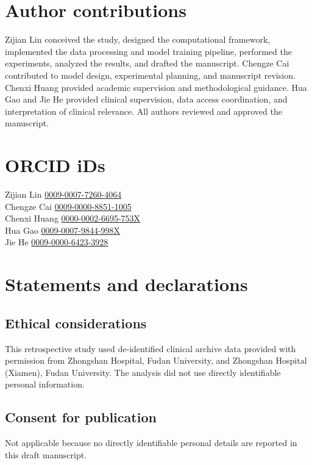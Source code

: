 \documentclass[Afour,sagev,times]{sagej}
\begin{document}
\section*{Author contributions}

Zijian Lin conceived the study, designed the computational framework, implemented the data processing and model training pipeline, performed the experiments, analyzed the results, and drafted the manuscript. Chengze Cai contributed to model design, experimental planning, and manuscript revision. Chenxi Huang provided academic supervision and methodological guidance. Hua Gao and Jie He provided clinical supervision, data access coordination, and interpretation of clinical relevance. All authors reviewed and approved the manuscript.

\section*{ORCID iDs}
Zijian Lin \href{https://orcid.org/0009-0007-7260-4064}{0009-0007-7260-4064}\\
Chengze Cai \href{https://orcid.org/0009-0000-8851-1005}{0009-0000-8851-1005}\\
Chenxi Huang \href{https://orcid.org/0000-0002-6695-753X}{0000-0002-6695-753X}\\
Hua Gao \href{https://orcid.org/0009-0007-9844-998X}{0009-0007-9844-998X}\\
Jie He \href{https://orcid.org/0009-0000-6423-3928}{0009-0000-6423-3928}

\section*{Statements and declarations}

\subsection*{Ethical considerations}

This retrospective study used de-identified clinical archive data provided with permission from Zhongshan Hospital, Fudan University, and Zhongshan Hospital (Xiamen), Fudan University. The analysis did not use directly identifiable personal information.

\subsection*{Consent for publication}

Not applicable because no directly identifiable personal details are reported in this draft manuscript.
\end{document}
